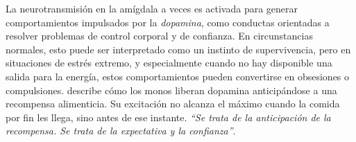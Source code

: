 La neurotransmisión en la amígdala a veces es activada para generar comportamientos impulsados por la {\it dopamina}, como conductas orientadas a resolver problemas de control corporal y de confianza. En circunstancias normales, esto puede ser interpretado como un instinto de supervivencia, pero en situaciones de estrés extremo, y especialmente cuando no hay disponible una salida para la energía, estos comportamientos pueden convertirse en obsesiones o compulsiones. \cite{Sapolsky2005} describe cómo los monos liberan dopamina anticipándose a una recompensa alimenticia. Su excitación no alcanza el máximo cuando la comida por fin les llega, sino antes de ese instante. {\it ``Se trata de la anticipación de la recompensa. Se trata de la expectativa y la confianza''}.









